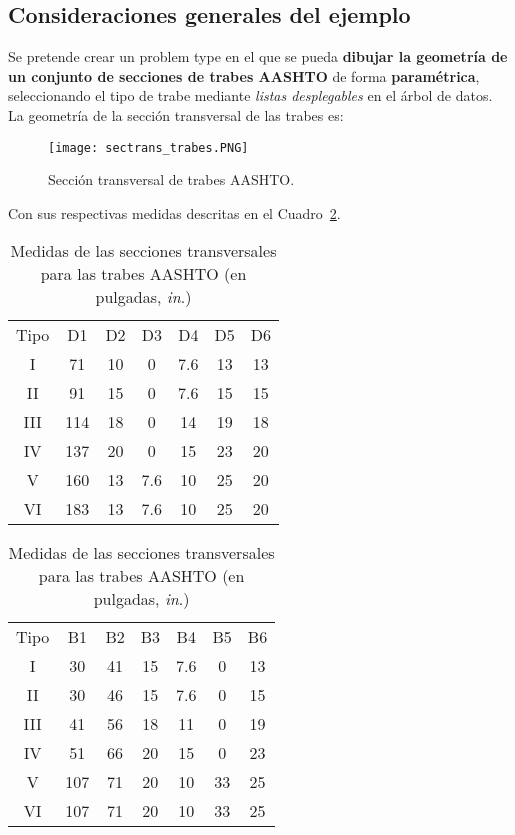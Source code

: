 \documentclass[10pt, a4paper, twocolumn]{article} %
\begin{document}
\subsection{Consideraciones generales del ejemplo} \label{sec:consideraciones}

Se pretende crear un problem type en el que se pueda \textbf{dibujar la geometría de un conjunto de secciones de trabes AASHTO} de forma \textbf{paramétrica}, seleccionando el tipo de trabe mediante \textit{listas desplegables} en el árbol de datos. La geometría de la sección transversal de las trabes es:

\begin{figure}[hbt!]
	\centering
	\texttt{[image: sectrans\_trabes.PNG]}
	
	\caption{Sección transversal de trabes AASHTO.\label{fig:sectrans_trabes}}
\end{figure}

Con sus respectivas medidas descritas en el Cuadro~\ref{tab:medidasAASHTO}.

\begin{table}[hbtp!]
\centering
	\begin{tabular}{*{7}{c}}
		\rowcolor{BlueGiD!60} Tipo&D1&D2&D3&D4&D5&D6\\
		\rowcolor{BlueGiD!20} I&71&10&0&7.6&13&13\\
		II&91&15&0&7.6&15&15\\
		\rowcolor{BlueGiD!20}III&114&18&0&14&19&18\\
		IV&137&20&0&15&23&20\\
		\rowcolor{BlueGiD!20}V&160&13&7.6&10&25&20\\
		VI&183&13&7.6&10&25&20\\
	\end{tabular}
	\vspace{0.2cm}
	\begin{tabular}{*{7}{c}}
		\rowcolor{BlueGiD!60} Tipo&B1&B2&B3&B4&B5&B6\\
		\rowcolor{BlueGiD!20} I&30&41&15&7.6&0&13\\
		II&30&46&15&7.6&0&15\\
		\rowcolor{BlueGiD!20}III&41&56&18&11&0&19\\
		IV&51&66&20&15&0&23\\
		\rowcolor{BlueGiD!20}V&107&71&20&10&33&25\\
		VI&107&71&20&10&33&25\\
	\end{tabular}
	\caption{Medidas de las secciones transversales para las trabes AASHTO (en pulgadas, \textit{in}.\label{tab:medidasAASHTO})}
\end{table}
\end{document}

